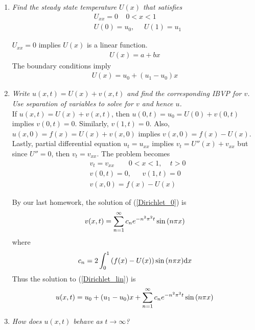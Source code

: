 \documentclass{article} %
\theoremstyle{plain}
\begin{document}
\begin{enumerate}[\bf (a)]  
    \item
        \emph{Find the steady state temperature $U(x)$ that satisfies}
        \begin{align*}
            &U_{xx} = 0 \ \ \ \ \ 0 < x < 1 \\
            &U(0) = u_0,\ \ \ \ \ \ U(1) = u_1
        \end{align*}

        $U_{xx} = 0$ implies $U(x)$ is a linear function.
        \begin{align*}
            U(x) = a + bx
        \end{align*}
        The boundary conditions imply
        \begin{align*}
            U(x) = u_0 + (u_1 - u_0)x
        \end{align*}
    \item
        \emph{Write $u(x,t) = U(x) + v(x,t)$ and find the corresponding IBVP for $v$.  Use separation of variables to solve for $v$ and hence $u$.} \\

        If $u(x, t) = U(x) + v(x, t)$, then $u(0, t) = u_0 = U(0) + v(0, t)$ implies $v(0, t) = 0$.  Similarly, $v(1,t) = 0$.  Also, $u(x,0) = f(x) = U(x) + v(x,0)$ implies $v(x,0) = f(x) - U(x)$.  Lastly, partial differential equation $u_t = u_{xx}$ implies $v_t = U''(x) + v_{xx}$ but since $U'' = 0$, then $v_t = v_{xx}$.  The problem becomes
        \begin{equation}
            \label{Dirichlet_0}
            \begin{aligned}
                &v_t = v_{xx}\ \ \ \ \ \ \ \ \ 0 < x < 1,\ \ \ \ \ t > 0 \\
                &v(0, t) = 0, \ \ \ \ \ \ \ v(1,t) = 0 \\
                &v(x,0) = f(x) - U(x)
            \end{aligned}
        \end{equation}

        By our last homework, the solution of (\ref{Dirichlet_0}) is
        \begin{align*}
            v(x,t) = \sum_{n=1}^\infty c_n e^{-n^2\pi^2 t}\sin\qty(n\pi x)
        \end{align*}
        where
        \begin{align*}
            c_n = 2\int_0^1\qty(f(x) - U(x))\sin\qty(n\pi x) \dd x
        \end{align*}
        Thus the solution to (\ref{Dirichlet_lin}) is
        \begin{align*}
            u(x, t) = u_0 + (u_1 - u_0)x + \sum_{n=1}^\infty c_n e^{-n^2\pi^2 t}\sin\qty(n\pi x)
        \end{align*}
    \item
        \emph{How does $u(x,t)$ behave as $t \rightarrow \infty$?} \\


\end{enumerate}
\end{document}
